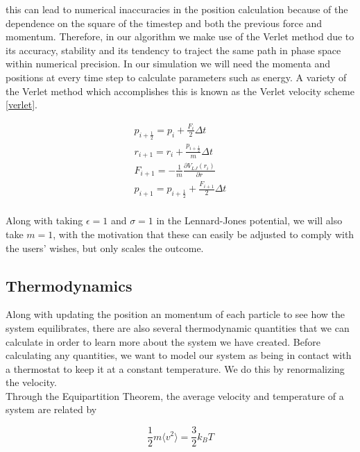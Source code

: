 \documentclass{article}
\begin{document}
\begin{multicols}{2}
\noindent this can lead to numerical inaccuracies in the position calculation because of the dependence on the square of the timestep and both the previous force and momentum. Therefore, in our algorithm we make use of the Verlet method due to its accuracy, stability and its tendency to traject the same path in phase space within numerical precision. In our simulation we will need the momenta and positions at every time step to calculate parameters such as energy. A variety of the Verlet method which accomplishes this is known as the Verlet velocity scheme \ref{verlet}.


\begin{equation}
\label{verletvscheme}
\begin{split}
p_{i+\frac{1}{2}}=p_i + \frac{F_i}{2} \Delta t \\
r_{i+1}=r_i+\frac{p_{i+\frac{1}{2}}}{m} \Delta t \\
F_{i+1}=-\frac{1}{m} \frac{\partial V_{LJ}(r_i)}{\partial r} \\
p_{i+1} = p_{i+\frac{1}{2}} + \frac{F_{i+1}}{2} \Delta t \\
\end{split}
\end{equation}

Along with taking $\epsilon =1$ and $\sigma =1$ in the Lennard-Jones potential, we will also take $m=1$, with the motivation that these can easily be adjusted to comply with the users' wishes, but only scales the outcome.

\subsection{Thermodynamics}

Along with updating the position an momentum of each particle to see how the system equilibrates, there are also several thermodynamic quantities that we can calculate in order to learn more about the system we have created.  Before calculating any quantities, we want to model our system as being in contact with a thermostat to keep it at a constant temperature.  We do this by renormalizing the velocity.  \\

Through the Equipartition Theorem, the average velocity and temperature of a system are related by

\begin{equation}
\label{vir}
\frac{1}{2}m \langle v^2 \rangle = \frac{3}{2} k_B T
\end{equation}


\end{multicols}
\end{document}

